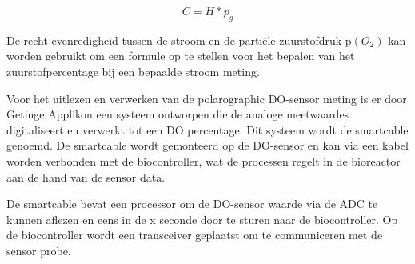 \begin{equation}\label{eq:henry}
	C = H*p_g
\end{equation}	

De recht evenredigheid tussen de stroom en de partiële zuurstofdruk p$(O_2)$ kan worden gebruikt om een formule op te stellen voor het bepalen van het zuurstofpercentage bij een bepaalde stroom meting.  

Voor het uitlezen en verwerken van de polarographic DO-sensor meting is er door Getinge Applikon een systeem ontworpen die de analoge meetwaardes digitaliseert en verwerkt tot een DO percentage. Dit systeem wordt de smartcable genoemd. De smartcable wordt gemonteerd op de DO-sensor en kan via een kabel worden verbonden met de biocontroller, wat de processen regelt in de bioreactor aan de hand van de sensor data. 

De smartcable bevat een processor om de DO-sensor waarde via de ADC te kunnen aflezen en eens in de x seconde door te sturen naar de biocontroller. Op de biocontroller wordt een transceiver geplaatst om te communiceren met de sensor probe.

%
%
%
%
%
